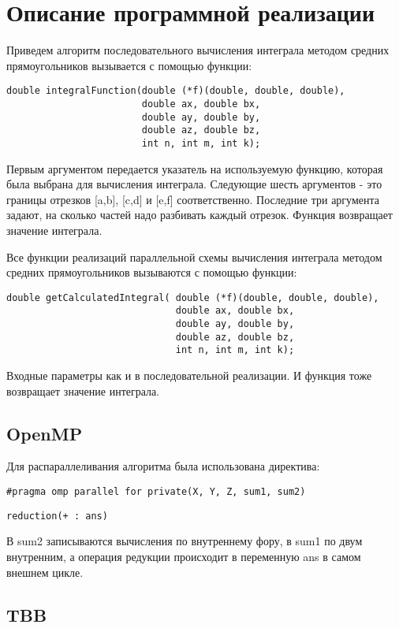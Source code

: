 \documentclass{report}
\begin{document}
\section*{Описание программной реализации}
\par Приведем алгоритм последовательного вычисления интеграла методом средних прямоугольников вызывается с помощью функции:
\begin{lstlisting}
double integralFunction(double (*f)(double, double, double),
                        double ax, double bx,
                        double ay, double by,
                        double az, double bz,
                        int n, int m, int k);
\end{lstlisting}
\par Первым аргументом передается указатель на используемую функцию, которая была выбрана для вычисления интеграла. Следующие шесть аргументов - это границы отрезков [a,b], [c,d] и [e,f] соответственно. Последние три аргумента задают, на сколько частей надо разбивать каждый отрезок. Функция возвращает значение интеграла.
\par Все функции реализаций параллельной схемы вычисления интеграла методом средних прямоугольников вызываются с помощью функции:
\begin{lstlisting}
double getCalculatedIntegral( double (*f)(double, double, double),
                              double ax, double bx,
                              double ay, double by,
                              double az, double bz,
                              int n, int m, int k);
\end{lstlisting}
\par Входные параметры как и в последовательной реализации. И функция тоже возвращает значение интеграла.
\newpage

\subsection*{OpenMP}
Для распараллеливания алгоритма была использована директива:
\par \verb|#pragma omp parallel for private(X, Y, Z, sum1, sum2)|
\par \verb|reduction(+ : ans)|
\par В sum2 записываются вычисления по внутреннему фору, в sum1 по двум внутренним, а операция редукции происходит в переменную ans в самом внешнем цикле.
\subsection*{TBB}
\end{document}
